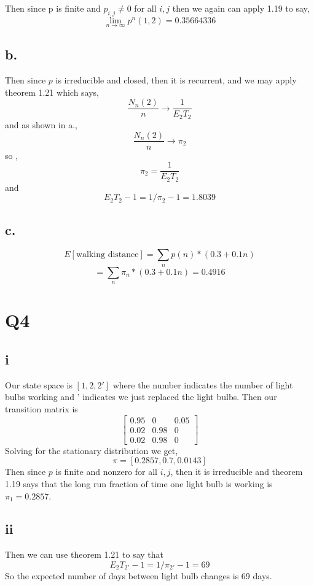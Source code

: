 \documentclass{article}
\begin{document}
Then since p is finite and $p_{i,j} \neq 0$ for all $i,j$ then we again can apply 1.19 to say,  
\[
\lim_{n \to \infty} p^n(1,2) = 0.35664336
\]
\subsection*{b.}
Then since $p$ is irreducible and closed, then it is recurrent, and we may apply theorem 1.21 which says,
\[
\frac{N_n(2)}{n} \rightarrow \frac{1}{E_2T_2}
\]
and as shown in a.,
\[
\frac{N_n(2)}{n} \rightarrow \pi_2
\]
so ,
\[
\pi_2 = \frac{1}{E_2T_2}
\]
and
\[
E_2T_2 -1 = 1/\pi_2 -1 = 1.8039
\]
\subsection*{c.}
\[
E[\text{walking distance}] = \sum_{n} p(n) * (0.3 + 0.1n)
\]
\[
= \sum_{n} \pi_n * (0.3 + 0.1n) = 0.4916
\]

\section*{Q4}
\subsection*{i}
Our state space is $[1,2,2']$ where the number indicates the number of light bulbs working and ' indicates we just replaced  the light bulbs.
Then our transition matrix is
\[
\begin{bmatrix}
0.95 & 0 & 0.05\\
0.02 & 0.98 & 0\\
0.02 & 0.98 & 0 
\end{bmatrix}
\]
Solving for the stationary distribution we get,
\[
\pi = [ 0.2857,  0.7       ,  0.0143]
\]
Then since $p$ is finite and nonzero for all $i,j$, then it is irreducible and theorem 1.19 says that the long run fraction of time one light bulb is working is $\pi_1 = 0.2857$. 

\subsection*{ii}
Then we can use theorem 1.21 to say that
\[
E_2T_{2'} - 1 = 1/\pi_{2'} -1 = 69
\]
So the expected number of days between light bulb changes is 69 days.
\end{document}
